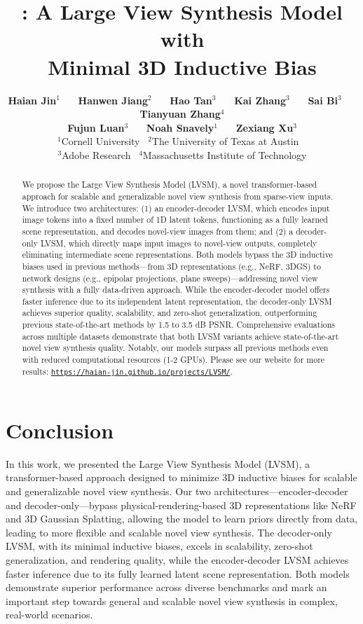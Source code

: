 \documentclass{article} %
\title{{\paperName}: A Large View Synthesis Model with \\ Minimal 3D Inductive Bias}
\author{%
\textbf{Haian Jin$^{1}$}~~~
\textbf{Hanwen Jiang$^{2}$}~~~
\textbf{Hao Tan$^{3}$}~~~
\textbf{Kai Zhang$^{3}$}~~~
\textbf{Sai Bi$^{3}$}~~~
\textbf{Tianyuan Zhang$^{4}$}\\
\textbf{Fujun Luan$^{3}$}~~~
\textbf{Noah Snavely$^{1}$}~~~
\textbf{Zexiang Xu$^{3}$} 
\\
$^{1}$Cornell University \ 
$^{2}$The University of Texas at Austin \
\\
$^{3}$Adobe Research \ 
$^{4}$Massachusetts Institute of Technology
}
\begin{document}
\maketitle
\vspace{-5mm}
\begin{abstract}
\vspace{-3mm}
We propose the Large View Synthesis Model (LVSM), a novel transformer-based approach for scalable and generalizable novel view synthesis from sparse-view inputs. We introduce two architectures: (1) an encoder-decoder LVSM, which encodes input image tokens into a fixed number of 1D latent tokens, functioning as a fully learned scene representation, and decodes novel-view images from them; and (2) a decoder-only LVSM, which directly maps input images to novel-view outputs, completely eliminating intermediate scene representations. Both models bypass the 3D inductive biases used in previous methods---from 3D representations (e.g., NeRF, 3DGS) to network designs (e.g., epipolar projections, plane sweeps)---addressing novel view synthesis with a fully data-driven approach. 
While the encoder-decoder model offers faster inference due to its independent latent representation, the decoder-only LVSM achieves superior quality, scalability, and zero-shot generalization, outperforming previous state-of-the-art methods by 1.5 to 3.5 dB PSNR. Comprehensive evaluations across multiple datasets demonstrate that both LVSM variants achieve state-of-the-art novel view synthesis quality. Notably, our models surpass all previous methods even with reduced computational resources (1-2 GPUs). Please see our website for more results: \textcolor{red}{\tt\small\url{https://haian-jin.github.io/projects/LVSM/}}.
\end{abstract}
\vspace{-3mm}





\vspace{-4mm}
\section{Conclusion}
\vspace{-4mm}
In this work, we presented the Large View Synthesis Model (LVSM), a transformer-based approach designed to minimize 3D inductive biases for scalable and generalizable novel view synthesis. Our two architectures—encoder-decoder and decoder-only—bypass physical-rendering-based 3D representations like NeRF and 3D Gaussian Splatting, allowing the model to learn priors directly from data, leading to more flexible and scalable novel view synthesis. The decoder-only LVSM, with its minimal inductive biases, excels in scalability, zero-shot generalization, and rendering quality, while the encoder-decoder LVSM achieves faster inference due to its fully learned latent scene representation. Both models demonstrate superior performance across diverse benchmarks and mark an important step towards general and scalable novel view synthesis in complex, real-world scenarios.
\end{document}

